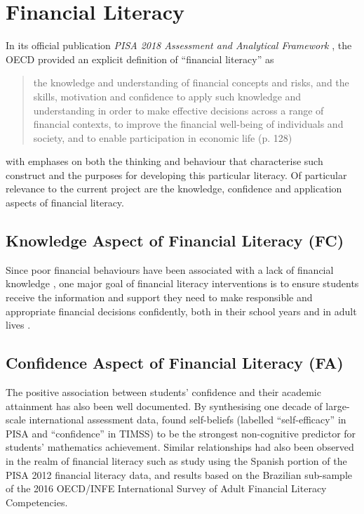 \documentclass[a4paper,11pt,UKenglish,twoside,openright]{report}\usepackage[]{graphicx}\usepackage[]{color}
\begin{document}
\section{Financial Literacy}\label{sec:flit}

In its official publication \textit{PISA 2018 Assessment and Analytical Framework} \parencite{PISAframework}, the OECD provided an explicit definition of ``financial literacy'' as
\vspace{-1em} %
    \blockquote{the knowledge and understanding of financial concepts and risks, and the skills, motivation and confidence to apply such knowledge and understanding in order to make effective decisions across a range of financial contexts, to improve the financial well-being of individuals and society, and to enable participation in economic life (p. 128)}
\vspace{-1em} %
with emphases on both the thinking and behaviour that characterise such construct and the purposes for developing this particular literacy. Of particular relevance to the current project are the knowledge, confidence and application aspects of financial literacy.


\subsection{Knowledge Aspect of Financial Literacy (FC)}

Since poor financial behaviours have been associated with a lack of financial knowledge \parencite{hastings:2013, lusardi:2014}, one major goal of financial literacy interventions is to ensure students receive the information and support they need to make responsible and appropriate financial decisions confidently, both in their school years and in adult lives \parencite{PISAvol4}.

\subsection{Confidence Aspect of Financial Literacy (FA)}

The positive association between students' confidence and their academic attainment has also been well documented. By synthesising one decade of large-scale international assessment data, \textcite{lee:2018} found self-beliefs (labelled ``self-efficacy'' in PISA and ``confidence'' in TIMSS) to be the strongest non-cognitive predictor for students' mathematics achievement. Similar relationships had also been observed in the realm of financial literacy such as  study using the Spanish portion of the PISA 2012 financial literacy data, and  results based on the Brazilian sub-sample of the 2016 OECD/INFE International Survey of Adult Financial Literacy Competencies.
\end{document}
